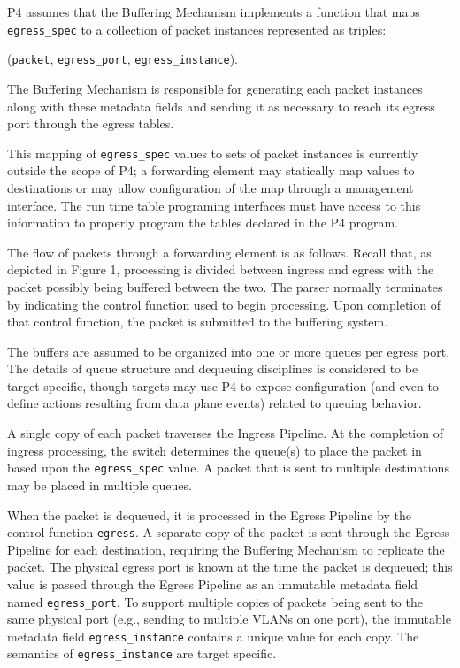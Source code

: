 \documentclass[12pt]{article}
\begin{document}
P4 assumes that the Buffering Mechanism implements a function that maps \texttt{egress_spec} to
a collection of packet instances represented as triples:

\centerline{(\texttt{packet}, \texttt{egress_port}, \texttt{egress_instance}).}

 The Buffering Mechanism is responsible for generating
each packet instances along with these metadata fields and sending it as necessary
to reach its egress port through the egress \matchaction tables.

This mapping of \texttt{egress_spec} values to sets of packet instances is currently
outside the scope of P4; a forwarding element may statically map values to
destinations or may allow configuration of the map through a management interface.
The run time table programing interfaces must have access to this information
to properly program the tables declared in the P4 program.

The flow of packets through a forwarding element is as follows. Recall that,
as depicted in Figure 1, processing is divided between ingress and egress
with the packet possibly being buffered between the two. The parser normally
terminates by indicating the control function used to begin processing.  Upon
completion of that control function, the packet is submitted to the buffering
system.

The buffers are assumed to be organized into one or more queues per egress
port. The details of queue structure and dequeuing disciplines is considered
to be target specific, though targets may use P4 to expose configuration (and
even to define actions resulting from data plane events) related to queuing
behavior.

A single copy of each packet traverses the Ingress Pipeline. At the completion
of ingress processing, the switch determines the queue(s) to place the packet
in based upon the \texttt{egress_spec} value. A packet that is sent to multiple destinations
may be placed in multiple queues.

When the packet is dequeued, it is processed in the Egress Pipeline by the
control function \texttt{egress}. A separate copy of the packet is sent through
the Egress Pipeline for each destination, requiring the Buffering Mechanism
to replicate the packet. The physical egress port is known at the time the
packet is dequeued; this value is passed through the Egress Pipeline as an
immutable metadata field named \texttt{egress_port}. To support multiple copies
of packets being sent to the same physical port (e.g., sending to multiple
VLANs on one port), the immutable metadata field \texttt{egress_instance} contains
a unique value for each copy. The semantics of \texttt{egress_instance} are target
specific.
\end{document}
